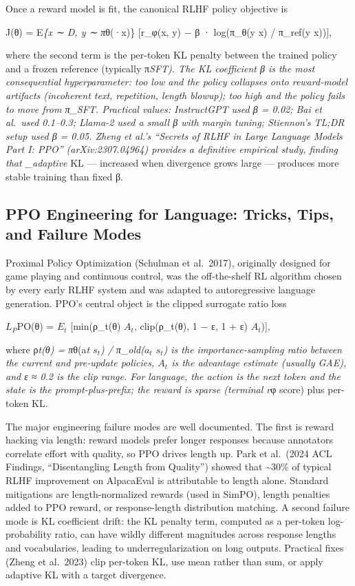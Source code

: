 Once a reward model is fit, the canonical RLHF policy objective is

J(θ) = E\emph{\{x ∼ D, y ∼ π}θ(·\textbar x)\} {[}r\_φ(x, y) − β · log(π\_θ(y \textbar{} x) / π\_ref(y \textbar{} x)){]},

where the second term is the per-token KL penalty between the trained policy and a frozen reference (typically π\emph{SFT). The KL coefficient β is the most consequential hyperparameter: too low and the policy collapses onto reward-model artifacts (incoherent text, repetition, length blowup); too high and the policy fails to move from π\_SFT. Practical values: InstructGPT used β = 0.02; Bai et al.~used 0.1--0.3; Llama-2 used a small β with margin tuning; Stiennon's TL;DR setup used β = 0.05. Zheng et al.'s ``Secrets of RLHF in Large Language Models Part I: PPO'' (arXiv:2307.04964) provides a definitive empirical study, finding that \_adaptive} KL --- increased when divergence grows large --- produces more stable training than fixed β.

\subsection{PPO Engineering for Language: Tricks, Tips, and Failure Modes}\label{ppo-engineering-for-language-tricks-tips-and-failure-modes}

Proximal Policy Optimization (Schulman et al.~2017), originally designed for game playing and continuous control, was the off-the-shelf RL algorithm chosen by every early RLHF system and was adapted to autoregressive language generation. PPO's central object is the clipped surrogate ratio loss

\(L_P\)PO(θ) = \(E_t\) {[}min(ρ\_t(θ) \(A_t\), clip(ρ\_t(θ), 1 − ε, 1 + ε) \(A_t\)){]},

where ρ\emph{t(θ) = π}θ(a\emph{t \textbar{} \(s_t\)) / π\_old(\(a_t\) \textbar{} \(s_t\)) is the importance-sampling ratio between the current and pre-update policies, \(A_t\) is the advantage estimate (usually GAE), and ε ≈ 0.2 is the clip range. For language, the action is the next token and the state is the prompt-plus-prefix; the reward is sparse (terminal r}φ score) plus per-token KL.

The major engineering failure modes are well documented. The first is reward hacking via length: reward models prefer longer responses because annotators correlate effort with quality, so PPO drives length up. Park et al.~(2024 ACL Findings, ``Disentangling Length from Quality'') showed that \textasciitilde30\% of typical RLHF improvement on AlpacaEval is attributable to length alone. Standard mitigations are length-normalized rewards (used in SimPO), length penalties added to PPO reward, or response-length distribution matching. A second failure mode is KL coefficient drift: the KL penalty term, computed as a per-token log-probability ratio, can have wildly different magnitudes across response lengths and vocabularies, leading to underregularization on long outputs. Practical fixes (Zheng et al.~2023) clip per-token KL, use mean rather than sum, or apply adaptive KL with a target divergence.

